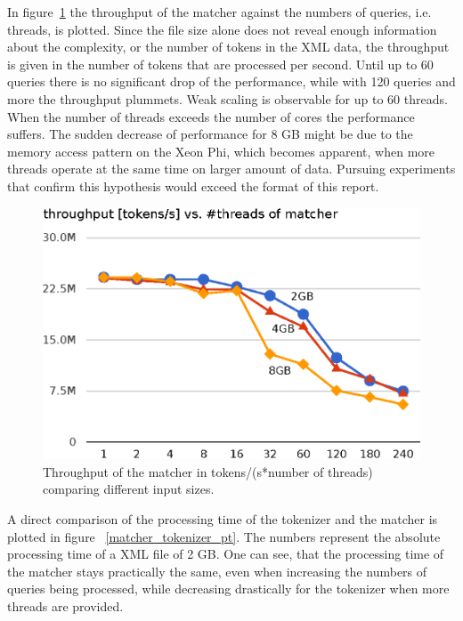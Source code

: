 In figure~\ref{matcher_throughput} the throughput of the matcher against the numbers of queries, i.e. threads, is plotted. Since the file size alone does not reveal enough information about the complexity, or the number of tokens in the XML data, the throughput is given in the number of tokens that are processed per second. Until up to 60 queries there is no significant drop of the performance, while with 120 queries and more the throughput plummets. Weak scaling is observable for up to 60 threads. When the number of threads exceeds the number of cores the performance suffers. The sudden decrease of performance for 8 GB might be due to the memory access pattern on the Xeon Phi, which becomes apparent, when more threads operate at the same time on larger amount of data. Pursuing experiments that confirm this hypothesis would exceed the format of this report. 

\begin{figure}[h]\centering
  \includegraphics[scale=.66]{img/matcher_throughput_2.eps}
  \caption{Throughput of the matcher in tokens/(s*number of threads) comparing different input sizes. \label{matcher_throughput}}
\end{figure}

A direct comparison of the processing time of the tokenizer and the matcher is plotted in figure ~\ref{matcher_tokenizer_pt}. The numbers represent the absolute processing time of a XML file of 2 GB. One can see, that the processing time of the matcher stays practically the same, even when increasing the numbers of queries being processed, while decreasing drastically for the tokenizer when more threads are provided.


